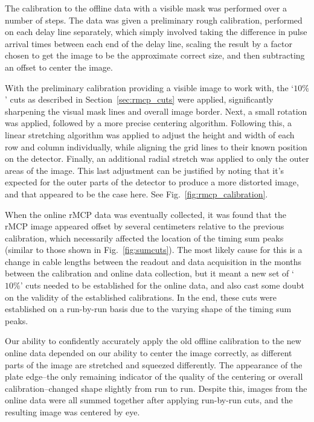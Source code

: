 The calibration to the offline data with a visible mask was performed over a number of steps.  The data was given a preliminary rough calibration, performed on each delay line separately, which simply involved taking the difference in pulse arrival times between each end of the delay line, scaling the result by a factor chosen to get the image to be the approximate correct size, and then subtracting an offset to center the image.  

With the preliminary calibration providing a visible image to work with, the `$10\%$' cuts as described in Section~\ref{sec:rmcp_cuts} were applied, significantly sharpening the visual mask lines and overall image border. Next, a small rotation was applied, followed by a more precise centering algorithm. Following this, a linear stretching algorithm was applied to adjust the height and width of each row and column individually, while aligning the grid lines to their known position on the detector.  Finally, an additional radial stretch was applied to only the outer areas of the image.  This last adjustment can be justified by noting that it's expected for the outer parts of the detector to produce a more distorted image, and that appeared to be the case here.  See Fig.~\ref{fig:rmcp_calibration}.

When the online rMCP data was eventually collected, it was found that the rMCP image appeared offset by several centimeters relative to the previous calibration, which necessarily affected the location of the timing sum peaks (similar to those shown in Fig.~\ref{fig:sumcuts}).  The most likely cause for this is a change in cable lengths between the readout and data acquisition in the months between the calibration and online data collection, but it meant a new set of `$10\%$' cuts needed to be established for the online data, and also cast some doubt on the validity of the established calibrations.  In the end, these cuts were established on a run-by-run basis due to the varying shape of the timing sum peaks.  

Our ability to confidently accurately apply the old offline calibration to the new online data depended on our ability to center the image correctly, as different parts of the image are stretched and squeezed differently.  The appearance of the plate edge--the only remaining indicator of the quality of the centering or overall calibration--changed shape slightly from run to run.  Despite this, images from the online data were all summed together after applying run-by-run cuts, and the resulting image was centered by eye.  

